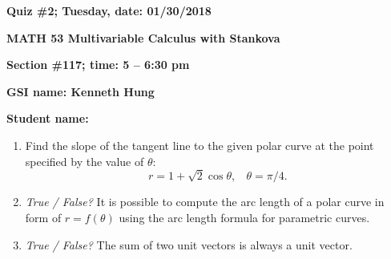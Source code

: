 \documentclass{article}
\begin{document}
{\bf Quiz \#2; Tuesday, date: 01/30/2018}

{\bf MATH 53 Multivariable Calculus with Stankova}

{\bf Section \#117; time: 5 -- 6:30 pm}

{\bf GSI name: Kenneth Hung}

{\bf Student name:}

\vspace*{0.25in}

\begin{enumerate}
\item Find the slope of the tangent line to the given polar curve at the point specified by the value of $\theta$:
\[
r = 1 + \sqrt{2} \cos \theta, ~~~~ \theta = \pi / 4.
\]

\item {\em True / False?} It is possible to compute the arc length of a polar curve in form of $r = f(\theta)$ using the arc length formula for parametric curves.

\item {\em True / False?} The sum of two unit vectors is always a unit vector.
\end{enumerate}
\end{document}
